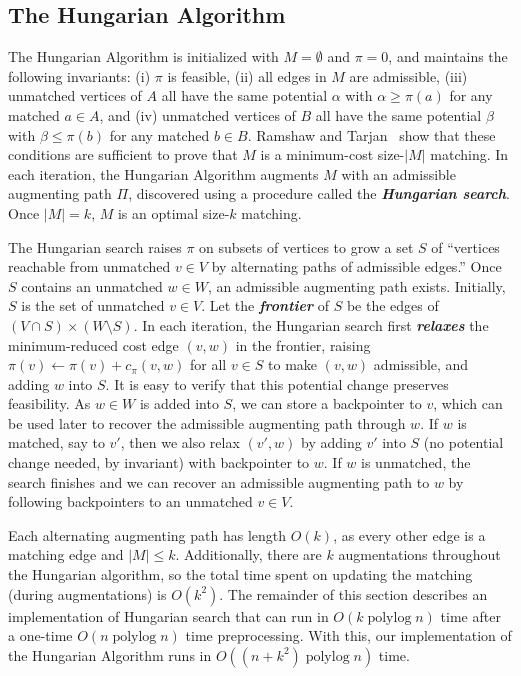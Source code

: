 \documentclass[a4paper,UKenglish]{socg-lipics-v2018}
\def\polylog{\mathop{\mathrm{polylog}}}
\def\abs#1{\mathopen| #1 \mathclose|}		%
\theoremstyle{plain}
\numberwithin{figure}{section}
\def\EMPH#1{\textbf{\emph{\boldmath #1}}}
\begin{document}
\subsection{The Hungarian Algorithm}

The Hungarian Algorithm is initialized with $M = \emptyset$ and $\pi = 0$,
and maintains the following invariants:
(i) $\pi$ is feasible,
(ii) all edges in $M$ are admissible,
(iii) unmatched vertices of $A$ all have the same potential $\alpha$ with $\alpha \geq \pi(a)$ for any matched $a \in A$,
and (iv) unmatched vertices of $B$ all have the same potential $\beta$ with $\beta \leq \pi(b)$ for any matched $b \in B$.
Ramshaw and Tarjan~\cite{RT12} show that these conditions are sufficient to
prove that $M$ is a minimum-cost size-$\abs{M}$ matching.
In each iteration, the Hungarian Algorithm augments $M$ with an admissible
augmenting path $\Pi$, discovered using a procedure called the
\EMPH{Hungarian search}.
Once $\abs{M} = k$, $M$ is an optimal size-$k$ matching.

The Hungarian search raises $\pi$ on subsets of vertices to grow a set $S$ of
``vertices reachable from unmatched $v \in V$ by alternating paths of
admissible edges.''
Once $S$ contains an unmatched $w \in W$, an admissible augmenting path exists.
Initially, $S$ is the set of unmatched $v \in V$.
Let the \EMPH{frontier} of $S$ be the edges of $(V \cap S) \times (W \setminus S)$.
In each iteration, the Hungarian search first \EMPH{relaxes} the
minimum-reduced cost edge $(v, w)$ in the frontier, raising
$\pi(v) \gets \pi(v) + c_\pi(v, w)$ for all $v \in S$ to make $(v, w)$
admissible, and adding $w$ into $S$.
It is easy to verify that this potential change preserves feasibility.
As $w \in W$ is added into $S$, we can store a backpointer to $v$, which can be
used later to recover the admissible augmenting path through $w$.
If $w$ is matched, say to $v'$, then we also relax $(v', w)$ by adding $v'$
into $S$ (no potential change needed, by invariant) with backpointer to $w$.
If $w$ is unmatched, the search finishes and we can recover an admissible
augmenting path to $w$ by following backpointers to an unmatched $v \in V$.

Each alternating augmenting path has length $O(k)$, as every other edge is a
matching edge and $|M| \leq k$.
Additionally, there are $k$ augmentations throughout the Hungarian algorithm,
so the total time spent on updating the matching (during augmentations) is
$O(k^2)$.
The remainder of this section describes an implementation of Hungarian search
that can run in $O(k\polylog n)$ time after a one-time $O(n\polylog n)$ time
preprocessing.
With this, our implementation of the Hungarian Algorithm runs in
$O((n + k^2)\polylog n)$ time.
\end{document}

